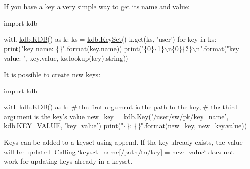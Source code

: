 If you have a key a very simple way to get its name and value\+:


\begin{DoxyCode}
\textcolor{keyword}{import} kdb

with \hyperlink{classkdb_1_1KDB}{kdb.KDB}() \textcolor{keyword}{as} k:
    ks = \hyperlink{classkdb_1_1KeySet}{kdb.KeySet}()
    k.get(ks, \textcolor{stringliteral}{'user'})
    \textcolor{keywordflow}{for} key \textcolor{keywordflow}{in} ks:
        print(\textcolor{stringliteral}{"key name:  \{\}"}.format(key.name))
        print(\textcolor{stringliteral}{"\{0\}\{1\}\(\backslash\)n\{0\}\{2\}\(\backslash\)n"}.format(\textcolor{stringliteral}{"key value: "}, key.value,
                                        ks.lookup(key).string))
\end{DoxyCode}


It is possible to create new keys\+:


\begin{DoxyCode}
\textcolor{keyword}{import} kdb

with \hyperlink{classkdb_1_1KDB}{kdb.KDB}() \textcolor{keyword}{as} k:
    \textcolor{comment}{# the first argument is the path to the key,}
    \textcolor{comment}{# the third argument is the key's value}
    new\_key = \hyperlink{classkdb_1_1Key}{kdb.Key}(\textcolor{stringliteral}{'/user/sw/pk/key\_name'}, kdb.KEY\_VALUE, \textcolor{stringliteral}{'key\_value'})
    print(\textcolor{stringliteral}{"\{\}: \{\}"}.format(new\_key, new\_key.value))
\end{DoxyCode}


Keys can be added to a keyset using {\ttfamily append}. If the key already exists, the value will be updated. Calling `keyset\+\_\+name\mbox{[}\textquotesingle{}/path/to/key\textquotesingle{}\mbox{]} = \textquotesingle{}new\+\_\+value` does not work for updating keys already in a keyset.


